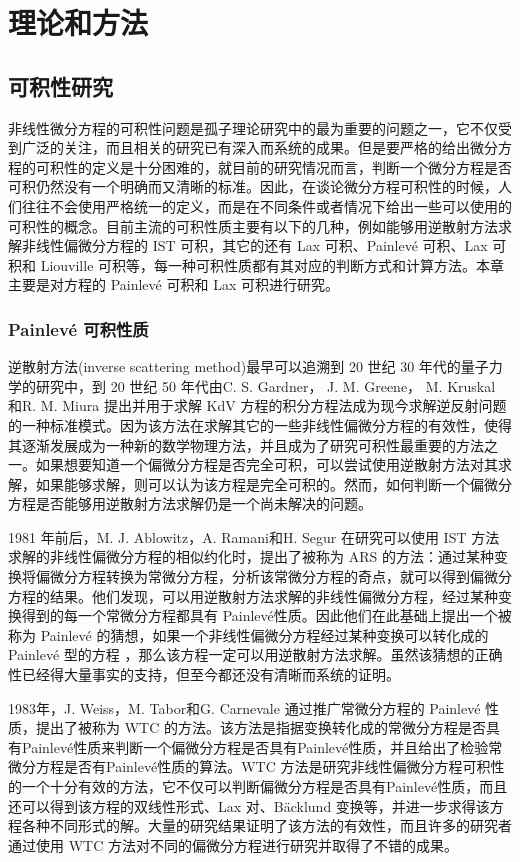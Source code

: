
\chapter{理论和方法}
\section{可积性研究}
非线性微分方程的可积性问题是孤子理论研究中的最为重要的问题之一，它不仅受到广泛的关注，而且相关的研究已有深入而系统的成果。但是要严格的给出微分方程的可积性的定义是十分困难的，就目前的研究情况而言，判断一个微分方程是否可积仍然没有一个明确而又清晰的标准。因此，在谈论微分方程可积性的时候，人们往往不会使用严格统一的定义，而是在不同条件或者情况下给出一些可以使用的可积性的概念。目前主流的可积性质主要有以下的几种，例如能够用逆散射方法求解非线性偏微分方程的 IST 可积，其它的还有 Lax 可积、Painlev\'{e} 可积、Lax 可积和 Liouville 可积等，每一种可积性质都有其对应的判断方式和计算方法。本章主要是对方程的 Painlev\'{e} 可积和 Lax 可积进行研究。

\subsection{Painlev\'{e} 可积性质}
逆散射方法(inverse scattering method)最早可以追溯到 20 世纪 30 年代的量子力学的研究中，到 20 世纪 50 年代由C. S. Gardner， J. M. Greene， M. Kruskal 和R. M. Miura 提出并用于求解 KdV 方程的积分方程法成为现今求解逆反射问题的一种标准模式。因为该方法在求解其它的一些非线性偏微分方程的有效性，使得其逐渐发展成为一种新的数学物理方法，并且成为了研究可积性最重要的方法之一。如果想要知道一个偏微分方程是否完全可积，可以尝试使用逆散射方法对其求解，如果能够求解，则可以认为该方程是完全可积的。然而，如何判断一个偏微分方程是否能够用逆散射方法求解仍是一个尚未解决的问题。

1981 年前后，M. J. Ablowitz，A. Ramani和H. Segur 在研究可以使用 IST 方法求解的非线性偏微分方程的相似约化时，提出了被称为 ARS 的方法：通过某种变换将偏微分方程转换为常微分方程，分析该常微分方程的奇点，就可以得到偏微分方程的结果。他们发现，可以用逆散射方法求解的非线性偏微分方程，经过某种变换得到的每一个常微分方程都具有 Painlev\'{e}性质。因此他们在此基础上提出一个被称为 Painlev\'{e} 的猜想，如果一个非线性偏微分方程经过某种变换可以转化成的 Painlev\'{e} 型的方程 ，那么该方程一定可以用逆散射方法求解。虽然该猜想的正确性已经得大量事实的支持，但至今都还没有清晰而系统的证明。

1983年，J. Weiss，M. Tabor和G. Carnevale 通过推广常微分方程的 Painlev\'{e} 性质，提出了被称为 WTC 的方法。该方法是指据变换转化成的常微分方程是否具有Painlev\'{e}性质来判断一个偏微分方程是否具有Painlev\'{e}性质，并且给出了检验常微分方程是否有Painlev\'{e}性质的算法。WTC 方法是研究非线性偏微分方程可积性的一个十分有效的方法，它不仅可以判断偏微分方程是否具有Painlev\'{e}性质，而且还可以得到该方程的双线性形式、Lax 对、B\"{a}cklund 变换等，并进一步求得该方程各种不同形式的解。大量的研究结果证明了该方法的有效性，而且许多的研究者通过使用 WTC 方法对不同的偏微分方程进行研究并取得了不错的成果。

